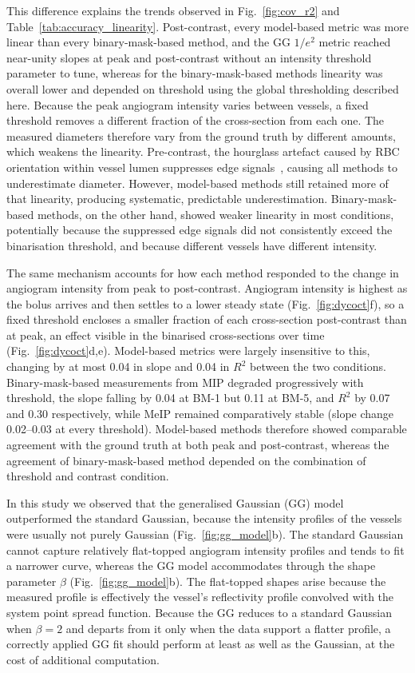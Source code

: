 \documentclass{optica-article}
\begin{document}
This difference explains the trends observed in Fig.~\ref{fig:cov_r2} and Table~\ref{tab:accuracy_linearity}. Post-contrast, every model-based metric was more linear than every binary-mask-based method, and the GG $1/e^2$ metric reached near-unity slopes at peak and post-contrast without an intensity threshold parameter to tune, whereas for the binary-mask-based methods linearity was overall lower and depended on threshold using the global thresholding described here. Because the peak angiogram intensity varies between vessels, a fixed threshold removes a different fraction of the cross-section from each one. The measured diameters therefore vary from the ground truth by different amounts, which weakens the linearity. Pre-contrast, the hourglass artefact caused by RBC orientation within vessel lumen suppresses edge signals~\cite{cimallaShearFlowinducedOptical2011,bernucciInvestigationArtifactsRetinal2018}, causing all methods to underestimate diameter. However, model-based methods still retained more of that linearity, producing systematic, predictable underestimation. Binary-mask-based methods, on the other hand, showed weaker linearity in most conditions, potentially because the suppressed edge signals did not consistently exceed the binarisation threshold, and because different vessels have different intensity.

The same mechanism accounts for how each method responded to the change in angiogram intensity from peak to post-contrast. Angiogram intensity is highest as the bolus arrives and then settles to a lower steady state (Fig.~\ref{fig:dycoct}f), so a fixed threshold encloses a smaller fraction of each cross-section post-contrast than at peak, an effect visible in the binarised cross-sections over time (Fig.~\ref{fig:dycoct}d,e). Model-based metrics were largely insensitive to this, changing by at most 0.04 in slope and 0.04 in $R^2$ between the two conditions. Binary-mask-based measurements from MIP degraded progressively with threshold, the slope falling by 0.04 at BM-1 but 0.11 at BM-5, and $R^2$ by 0.07 and 0.30 respectively, while MeIP remained comparatively stable (slope change 0.02--0.03 at every threshold). Model-based methods therefore showed comparable agreement with the ground truth at both peak and post-contrast, whereas the agreement of binary-mask-based method depended on the combination of threshold and contrast condition.

In this study we observed that the generalised Gaussian (GG) model outperformed the standard Gaussian, because the intensity profiles of the vessels were usually not purely Gaussian (Fig.~\ref{fig:gg_model}b). The standard Gaussian cannot capture relatively flat-topped angiogram intensity profiles and tends to fit a narrower curve, whereas the GG model accommodates through the shape parameter $\beta$ (Fig.~\ref{fig:gg_model}b). The flat-topped shapes arise because the measured profile is effectively the vessel's reflectivity profile convolved with the system point spread function. Because the GG reduces to a standard Gaussian when $\beta = 2$ and departs from it only when the data support a flatter profile, a correctly applied GG fit should perform at least as well as the Gaussian, at the cost of additional computation.
\end{document}
